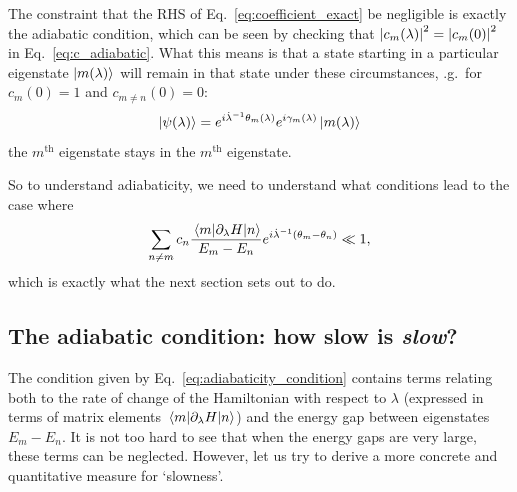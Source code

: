     The constraint that the RHS of Eq.~\eqref{eq:coefficient_exact} be negligible is exactly the adiabatic condition, which can be seen by checking that $\abs{c_m(\lambda)}^2 = \abs{c_m(0)}^2$ in Eq.~\eqref{eq:c_adiabatic}. What this means is that a state starting in a particular eigenstate $\ket{m(\lambda)}$ will remain in that state under these circumstances, \@e.g.~for $c_m(0) = 1$ and $c_{m \neq n}(0) = 0$:
    \begin{equation}\label{eq:adiabatic_states}
        \ket{\psi(\lambda)} = e^{i \dot{\lambda}^{-1} \theta_m(\lambda)}e^{i \gamma_m(\lambda)} \ket{m(\lambda)}
    \end{equation}
    the $m^{\text{th}}$ eigenstate stays in the $m^{\text{th}}$ eigenstate.
    
    So to understand adiabaticity, we need to understand what conditions lead to the case where
    \begin{equation}\label{eq:adiabaticity_condition}
        \sum_{n \neq m} c_n \frac{\mel{m}{\partial_{\lambda}H}{n}}{E_m - E_n}e^{i \dot{\lambda}^{-1} (\theta_m-\theta_n)} \ll 1,
    \end{equation}
    which is exactly what the next section sets out to do.
    
    \subsection{The adiabatic condition: how slow is \emph{slow}?}\label{sec:2.1.2_adiabatic_condition}

    The condition given by Eq.~\eqref{eq:adiabaticity_condition} contains terms relating both to the rate of change of the Hamiltonian with respect to $\lambda$ (expressed in terms of matrix elements $\mel{m}{\partial_{\lambda}H}{n}$) and the energy gap between eigenstates $E_m - E_n$. It is not too hard to see that when the energy gaps are very large, these terms can be neglected. However, let us try to derive a more concrete and quantitative measure for `slowness'.

